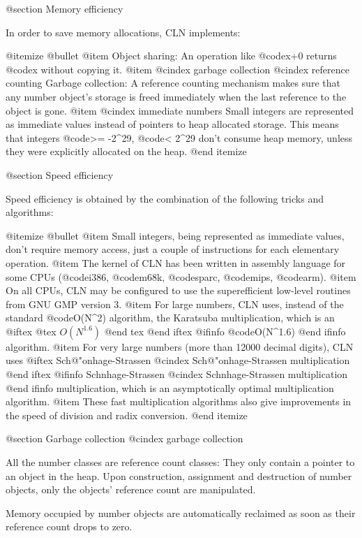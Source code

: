 @section Memory efficiency

In order to save memory allocations, CLN implements:

@itemize @bullet
@item
Object sharing: An operation like @code{x+0} returns @code{x} without copying
it.
@item
@cindex garbage collection
@cindex reference counting
Garbage collection: A reference counting mechanism makes sure that any
number object's storage is freed immediately when the last reference to the
object is gone.
@item
@cindex immediate numbers
Small integers are represented as immediate values instead of pointers
to heap allocated storage. This means that integers @code{>= -2^29},
@code{< 2^29} don't consume heap memory, unless they were explicitly allocated
on the heap.
@end itemize


@section Speed efficiency

Speed efficiency is obtained by the combination of the following tricks
and algorithms:

@itemize @bullet
@item
Small integers, being represented as immediate values, don't require
memory access, just a couple of instructions for each elementary operation.
@item
The kernel of CLN has been written in assembly language for some CPUs
(@code{i386}, @code{m68k}, @code{sparc}, @code{mips}, @code{arm}).
@item
On all CPUs, CLN may be configured to use the superefficient low-level
routines from GNU GMP version 3.
@item
For large numbers, CLN uses, instead of the standard @code{O(N^2)}
algorithm, the Karatsuba multiplication, which is an
@iftex
@tex
$O(N^{1.6})$
@end tex
@end iftex
@ifinfo
@code{O(N^1.6)}
@end ifinfo
algorithm.
@item
For very large numbers (more than 12000 decimal digits), CLN uses
@iftex
Sch{@"o}nhage-Strassen
@cindex Sch{@"o}nhage-Strassen multiplication
@end iftex
@ifinfo
Schnhage-Strassen
@cindex Schnhage-Strassen multiplication
@end ifinfo
multiplication, which is an asymptotically optimal multiplication 
algorithm.
@item
These fast multiplication algorithms also give improvements in the speed
of division and radix conversion.
@end itemize


@section Garbage collection
@cindex garbage collection

All the number classes are reference count classes: They only contain a pointer
to an object in the heap. Upon construction, assignment and destruction of
number objects, only the objects' reference count are manipulated.

Memory occupied by number objects are automatically reclaimed as soon as
their reference count drops to zero.

